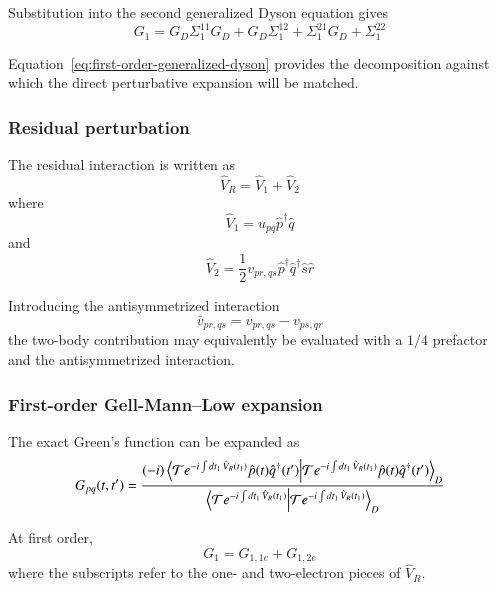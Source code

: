 \documentclass[aip,jcp,reprint,noshowkeys,superscriptaddress]{revtex4-1}
\begin{document}
Substitution into the second generalized Dyson equation gives
\begin{equation}
  G_1
  =
  G_D\Sigma_1^{11}G_D
  +
  G_D\Sigma_1^{12}
  +
  \Sigma_1^{21}G_D
  +
  \Sigma_1^{22}
  \label{eq:first-order-generalized-dyson}
\end{equation}

Equation~\eqref{eq:first-order-generalized-dyson} provides the
decomposition against which the direct perturbative expansion will be
matched.


\subsubsection{Residual perturbation}

The residual interaction is written as
\begin{equation}
  \hat V_R
  =
  \hat V_{1}
  +
  \hat V_{2}
\end{equation}
where
\begin{equation}
  \hat V_{1}
  =
  u_{pq}
  \hat p^\dagger
  \hat q
\end{equation}
and
\begin{equation}
  \hat V_{2}
  =
  \frac{1}{2}
  v_{pr,qs}
  \hat p^\dagger
  \hat q^\dagger
  \hat s
  \hat r
\end{equation}

Introducing the antisymmetrized interaction
\begin{equation}
  \bar v_{pr,qs}
  =
  v_{pr,qs}
  -
  v_{ps,qr}
\end{equation}
the two-body contribution may equivalently be evaluated with a
$1/4$ prefactor and the antisymmetrized interaction.


\subsubsection{First-order Gell-Mann--Low expansion}

The exact Green's function can be expanded as
\begin{equation}
  G_{pq}(t,t')
  =
  \frac{
    (-i)
    \braket{
      \mathcal T
      e^{-i\int dt_1\,\hat V_R(t_1)}
      \hat p(t)\hat q^\dagger(t')
    }_D
  }{
    \braket{
      \mathcal T
      e^{-i\int dt_1\,\hat V_R(t_1)}
    }_D
  }
\end{equation}

At first order,
\begin{equation}
  G_1
  =
  G_{1,1e}
  +
  G_{1,2e}
\end{equation}
where the subscripts refer to the one- and two-electron pieces of
$\hat V_R$.
\end{document}

